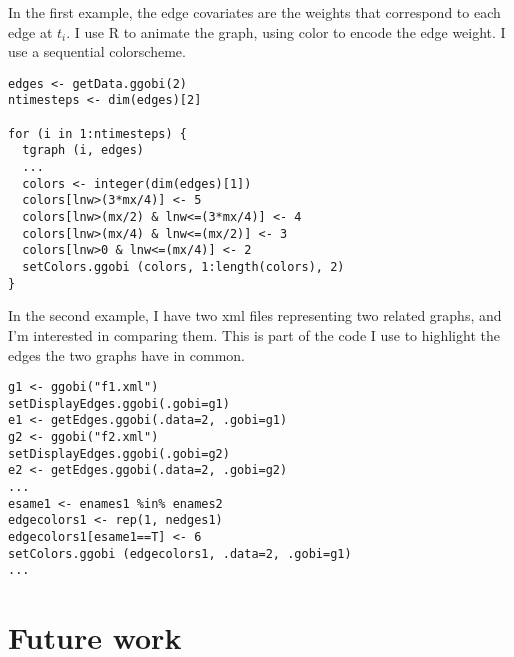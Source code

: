 \documentclass[11pt]{article}
\begin{document}
In the first example, the edge covariates are the weights that
correspond to each edge at $t_i$.  I use R to animate the graph,
using color to encode the edge weight.  I use a sequential
colorscheme.

\begin{verbatim}
edges <- getData.ggobi(2)
ntimesteps <- dim(edges)[2]

for (i in 1:ntimesteps) {
  tgraph (i, edges)
  ...
  colors <- integer(dim(edges)[1])
  colors[lnw>(3*mx/4)] <- 5
  colors[lnw>(mx/2) & lnw<=(3*mx/4)] <- 4
  colors[lnw>(mx/4) & lnw<=(mx/2)] <- 3
  colors[lnw>0 & lnw<=(mx/4)] <- 2
  setColors.ggobi (colors, 1:length(colors), 2)
}
\end{verbatim}

In the second example, I have two xml files representing two
related graphs, and I'm interested in comparing them.  This is
part of the code I use to highlight the edges the two graphs
have in common.

\begin{verbatim}
g1 <- ggobi("f1.xml")
setDisplayEdges.ggobi(.gobi=g1)
e1 <- getEdges.ggobi(.data=2, .gobi=g1)
g2 <- ggobi("f2.xml")
setDisplayEdges.ggobi(.gobi=g2)
e2 <- getEdges.ggobi(.data=2, .gobi=g2)
...
esame1 <- enames1 %in% enames2
edgecolors1 <- rep(1, nedges1)
edgecolors1[esame1==T] <- 6
setColors.ggobi (edgecolors1, .data=2, .gobi=g1)
...
\end{verbatim}

\section{Future work}



\end{document}
